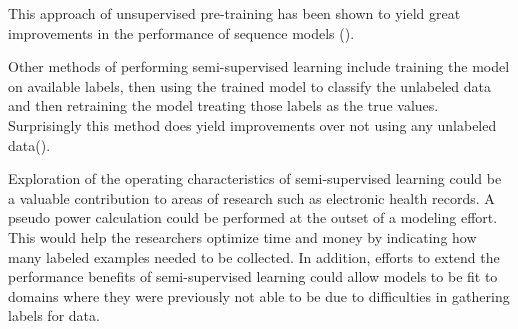 \documentclass[]{book}
\theoremstyle{definition}
\theoremstyle{definition}
\theoremstyle{definition}
\theoremstyle{remark}
\begin{document}
This approach of unsupervised pre-training has been shown to yield great
improvements in the performance of sequence models
(\citet{semi_supervised}).

Other methods of performing semi-supervised learning include training
the model on available labels, then using the trained model to classify
the unlabeled data and then retraining the model treating those labels
as the true values. Surprisingly this method does yield improvements
over not using any unlabeled data(\citet{semi_supervised}).

Exploration of the operating characteristics of semi-supervised learning
could be a valuable contribution to areas of research such as electronic
health records. A pseudo power calculation could be performed at the
outset of a modeling effort. This would help the researchers optimize
time and money by indicating how many labeled examples needed to be
collected. In addition, efforts to extend the performance benefits of
semi-supervised learning could allow models to be fit to domains where
they were previously not able to be due to difficulties in gathering
labels for data.


\end{document}
